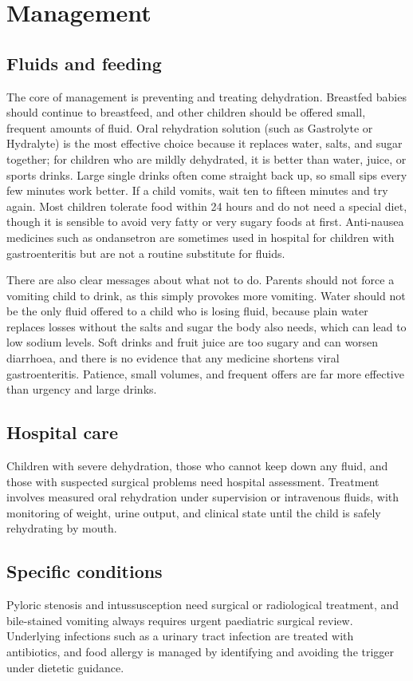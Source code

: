 \section*{Management}
\subsection*{Fluids and feeding}
The core of management is preventing and treating dehydration. Breastfed babies should continue to breastfeed, and other children should be offered small, frequent amounts of fluid. Oral rehydration solution (such as Gastrolyte or Hydralyte) is the most effective choice because it replaces water, salts, and sugar together; for children who are mildly dehydrated, it is better than water, juice, or sports drinks. Large single drinks often come straight back up, so small sips every few minutes work better. If a child vomits, wait ten to fifteen minutes and try again. Most children tolerate food within 24 hours and do not need a special diet, though it is sensible to avoid very fatty or very sugary foods at first. Anti-nausea medicines such as ondansetron are sometimes used in hospital for children with gastroenteritis but are not a routine substitute for fluids.

There are also clear messages about what not to do. Parents should not force a vomiting child to drink, as this simply provokes more vomiting. Water should not be the only fluid offered to a child who is losing fluid, because plain water replaces losses without the salts and sugar the body also needs, which can lead to low sodium levels. Soft drinks and fruit juice are too sugary and can worsen diarrhoea, and there is no evidence that any medicine shortens viral gastroenteritis. Patience, small volumes, and frequent offers are far more effective than urgency and large drinks.

\subsection*{Hospital care}
Children with severe dehydration, those who cannot keep down any fluid, and those with suspected surgical problems need hospital assessment. Treatment involves measured oral rehydration under supervision or intravenous fluids, with monitoring of weight, urine output, and clinical state until the child is safely rehydrating by mouth.

\subsection*{Specific conditions}
Pyloric stenosis and intussusception need surgical or radiological treatment, and bile-stained vomiting always requires urgent paediatric surgical review. Underlying infections such as a urinary tract infection are treated with antibiotics, and food allergy is managed by identifying and avoiding the trigger under dietetic guidance.

